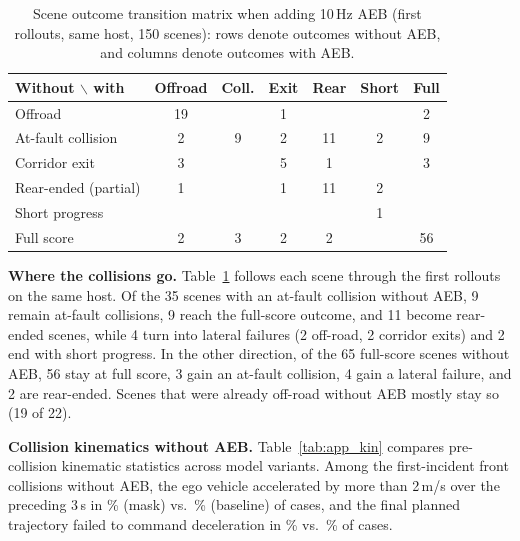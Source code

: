 \FloatBarrier
\begin{table}
\centering\scriptsize
\caption{Scene outcome transition matrix when adding 10\,Hz AEB (first rollouts, same host, 150 scenes): rows denote outcomes without AEB, and columns denote outcomes with AEB.}
\label{tab:app_flow}
\begin{tabular}{@{}lcccccc@{}}
\toprule
Without $\backslash$ with & Offroad & Coll. & Exit & Rear & Short & Full \\
\midrule
Offroad & 19 &  & 1 &  &  & 2 \\
At-fault collision & 2 & 9 & 2 & 11 & 2 & 9 \\
Corridor exit & 3 &  & 5 & 1 &  & 3 \\
Rear-ended (partial) & 1 &  & 1 & 11 & 2 &  \\
Short progress &  &  &  &  & 1 &  \\
Full score & 2 & 3 & 2 & 2 &  & 56 \\
\bottomrule
\end{tabular}
\end{table}
\textbf{Where the collisions go.} Table~\ref{tab:app_flow} follows each scene through the first rollouts on the same host. Of the 35 scenes with an at-fault collision without AEB, 9 remain at-fault collisions, 9 reach the full-score outcome, and 11 become rear-ended scenes, while 4 turn into lateral failures (2 off-road, 2 corridor exits) and 2 end with short progress. In the other direction, of the 65 full-score scenes without AEB, 56 stay at full score, 3 gain an at-fault collision, 4 gain a lateral failure, and 2 are rear-ended. Scenes that were already off-road without AEB mostly stay so (19 of 22).

\textbf{Collision kinematics without AEB.} Table~\ref{tab:app_kin} compares pre-collision kinematic statistics across model variants. Among the first-incident front collisions without AEB, the ego vehicle accelerated by more than 2\,m/s over the preceding 3\,s in \RMaskAccel\% (mask) vs.\ \RBaseAccel\% (baseline) of cases, and the final planned trajectory failed to command deceleration in \RMaskNoSlow\% vs.\ \RBaseNoSlow\% of cases.

